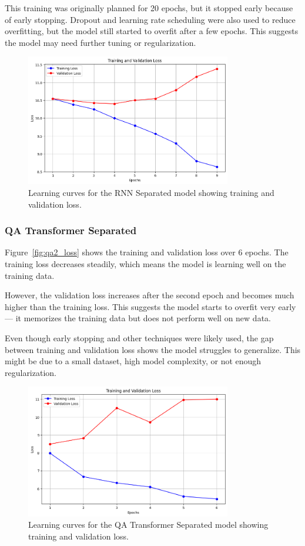 \documentclass[runningheads]{llncs}
\begin{document}
This training was originally planned for 20 epochs, but it stopped early because of early stopping. Dropout and learning rate scheduling were also used to reduce overfitting, but the model still started to overfit after a few epochs. This suggests the model may need further tuning or regularization.
\begin{figure}[H]
\centering
\includegraphics[width=0.8\textwidth]{images/rnn_loss.png}
\caption{Learning curves for the RNN Separated model showing training and validation loss.}
\label{fig:rnn_loss}
\end{figure}

\subsubsection*{QA Transformer Separated}
Figure~\ref{fig:qa2_loss} shows the training and validation loss over 6 epochs. The training loss decreases steadily, which means the model is learning well on the training data.

However, the validation loss increases after the second epoch and becomes much higher than the training loss. This suggests the model starts to overfit very early — it memorizes the training data but does not perform well on new data.

Even though early stopping and other techniques were likely used, the gap between training and validation loss shows the model struggles to generalize. This might be due to a small dataset, high model complexity, or not enough regularization.
\begin{figure}[H]
\centering
\includegraphics[width=0.8\textwidth]{images/qa2_loss.png}
\caption{Learning curves for the QA Transformer Separated model showing training and validation loss.}
\label{fig:qa_transformer_loss}
\end{figure}
\end{document}
